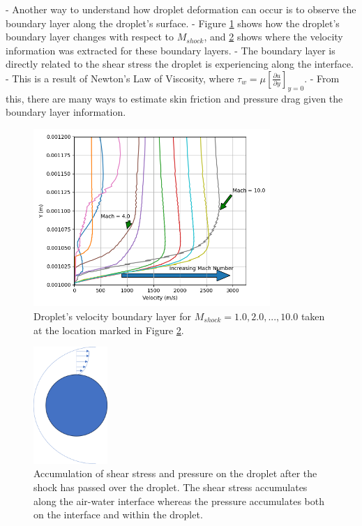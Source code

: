 \documentclass{UCF_ETD}
\begin{document}
- Another way to understand how droplet deformation can occur is to observe the boundary layer along the droplet's surface.
- Figure \ref{fig:boundary_layer_v_Mach} shows how the droplet's boundary layer changes with respect to $M_{shock}$, and \ref{fig:BL_diagram} shows where the velocity information was extracted for these boundary layers.
- The boundary layer is directly related to the shear stress the droplet is experiencing along the interface. 
- This is a result of Newton's Law of Viscosity, where $\tau_{w} = \mu \left[\frac{\partial u}{\partial y}\right]_{y=0}$. 
- From this, there are many ways to estimate skin friction and pressure drag given the boundary layer information. 

\begin{figure}
    \centering
    \includegraphics[width=0.8\textwidth]{Figures/coplotted_BLs.png}
    \caption{Droplet's velocity boundary layer for $M_{shock} = 1.0, 2.0,...,10.0$ taken at the location marked in Figure \ref{fig:BL_diagram}.}
    \label{fig:boundary_layer_v_Mach}
\end{figure}

\begin{figure}
    \centering
    \includegraphics[width=0.25\textwidth]{Figures/BL_diagram.png}
    \caption{Accumulation of shear stress and pressure on the droplet after the shock has passed over the droplet. The shear stress accumulates along the air-water interface whereas the pressure accumulates both on the interface and within the droplet.}
    \label{fig:BL_diagram}
\end{figure}
\end{document}
